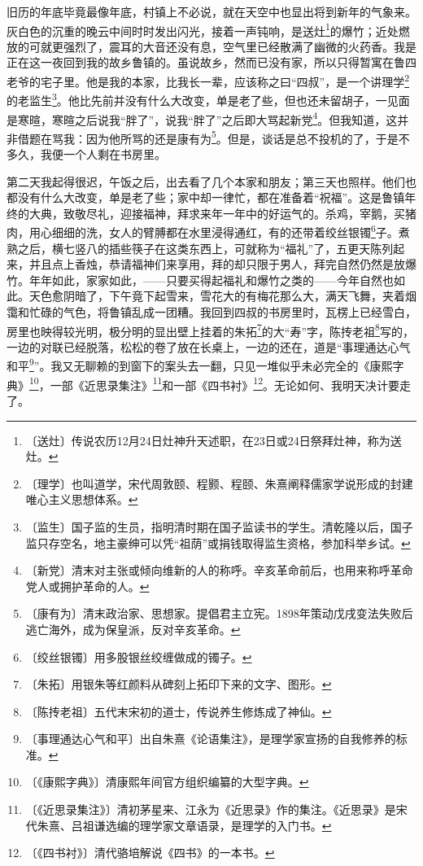 \documentclass[12pt,UTF-8,openany]{ctexbook}
\begin{document}
\begin{normalsize}
    
    旧历的年底毕竟最像年底，村镇上不必说，就在天空中也显出将到新年的气象来。灰白色的沉重的晚云中间时时发出闪光，接着一声钝响，是送灶\footnote{〔送灶〕传说农历12月24日灶神升天述职，在23日或24日祭拜灶神，称为送灶。}的爆竹；近处燃放的可就更强烈了，震耳的大音还没有息，空气里已经散满了幽微的火药香。我是正在这一夜回到我的故乡鲁镇的。虽说故乡，然而已没有家，所以只得暂寓在鲁四老爷的宅子里。他是我的本家，比我长一辈，应该称之曰“四叔”，是一个讲理学\footnote{〔理学〕也叫道学，宋代周敦颐、程颢、程颐、朱熹阐释儒家学说形成的封建唯心主义思想体系。}的老监生\footnote{〔监生〕国子监的生员，指明清时期在国子监读书的学生。清乾隆以后，国子监只存空名，地主豪绅可以凭“祖荫”或捐钱取得监生资格，参加科举乡试。}。他比先前并没有什么大改变，单是老了些，但也还未留胡子，一见面是寒暄，寒暄之后说我“胖了”，说我“胖了”之后即大骂起新党\footnote{〔新党〕清末对主张或倾向维新的人的称呼。辛亥革命前后，也用来称呼革命党人或拥护革命的人。}。但我知道，这并非借题在骂我：因为他所骂的还是康有为\footnote{〔康有为〕清末政治家、思想家。提倡君主立宪。1898年策动戊戌变法失败后逃亡海外，成为保皇派，反对辛亥革命。}。但是，谈话是总不投机的了，于是不多久，我便一个人剩在书房里。
    
    第二天我起得很迟，午饭之后，出去看了几个本家和朋友；第三天也照样。他们也都没有什么大改变，单是老了些；家中却一律忙，都在准备着“祝福”。这是鲁镇年终的大典，致敬尽礼，迎接福神，拜求来年一年中的好运气的。杀鸡，宰鹅，买猪肉，用心细细的洗，女人的臂膊都在水里浸得通红，有的还带着绞丝银镯\footnote{〔绞丝银镯〕用多股银丝绞缠做成的镯子。}子。煮熟之后，横七竖八的插些筷子在这类东西上，可就称为“福礼”了，五更天陈列起来，并且点上香烛，恭请福神们来享用，拜的却只限于男人，拜完自然仍然是放爆竹。年年如此，家家如此，——只要买得起福礼和爆竹之类的——今年自然也如此。天色愈阴暗了，下午竟下起雪来，雪花大的有梅花那么大，满天飞舞，夹着烟霭和忙碌的气色，将鲁镇乱成一团糟。我回到四叔的书房里时，瓦楞上已经雪白，房里也映得较光明，极分明的显出壁上挂着的朱拓\footnote{〔朱拓〕用银朱等红颜料从碑刻上拓印下来的文字、图形。}的大“寿”字，陈抟老祖\footnote{〔陈抟老祖〕五代末宋初的道士，传说养生修炼成了神仙。}写的，一边的对联已经脱落，松松的卷了放在长桌上，一边的还在，道是“事理通达心气和平\footnote{〔事理通达心气和平〕出自朱熹《论语集注》，是理学家宣扬的自我修养的标准。}”。我又无聊赖的到窗下的案头去一翻，只见一堆似乎未必完全的《康熙字典》\footnote{〔《康熙字典》〕清康熙年间官方组织编纂的大型字典。}，一部《近思录集注》\footnote{〔《近思录集注》〕清初茅星来、江永为《近思录》作的集注。《近思录》是宋代朱熹、吕祖谦选编的理学家文章语录，是理学的入门书。}和一部《四书衬》\footnote{〔《四书衬》〕清代骆培解说《四书》的一本书。}。无论如何、我明天决计要走了。
    

\end{normalsize}
\end{document}
